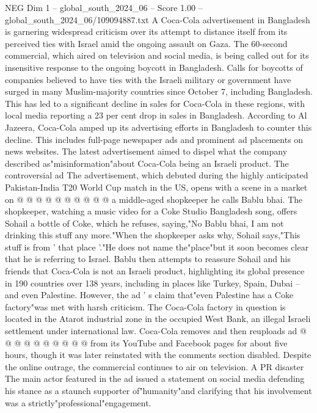 \begin{textsample}{NEG Dim 1 – global\_south\_2024\_06 – Score 1.00 – global\_south\_2024\_06/109094887.txt}  \label{ex:f1_neg_401}
A Coca-Cola advertisement in Bangladesh is garnering widespread criticism over its attempt to distance itself from its perceived ties with Israel amid the ongoing assault on Gaza.
The 60-second commercial, which aired on television and social media, is being called out for its insensitive response to the ongoing boycott in Bangladesh.
Calls for boycotts of companies believed to have ties with the Israeli military or government have surged in many Muslim-majority countries since October 7, including Bangladesh.
This has led to a significant decline in sales for Coca-Cola in these regions, with local media reporting a 23 per cent drop in sales in Bangladesh.
According to Al Jazeera, Coca-Cola amped up its advertising efforts in Bangladesh to counter this decline.
This includes full-page newspaper ads and prominent ad placements on news websites.
The latest advertisement aimed to dispel what the company described as"misinformation"about Coca-Cola being an Israeli product.
The controversial ad The advertisement, which debuted during the highly anticipated Pakistan-India T20 World Cup match in the US, opens with a scene in a market on @ @ @ @ @ @ @ @ @ @ a middle-aged shopkeeper he calls Bablu bhai.
The shopkeeper, watching a music video for a Coke Studio Bangladesh song, offers Sohail a bottle of Coke, which he refuses, saying,"No Bablu bhai, I am not drinking this stuff any more."When the shopkeeper asks why, Sohail says,"This stuff is from ' that place '."He does not name the"place"but it soon becomes clear that he is referring to Israel.
Bablu then attempts to reassure Sohail and his friends that Coca-Cola is not an Israeli product, highlighting its global presence in 190 countries over 138 years, including in places like Turkey, Spain, Dubai -- and even Palestine.
However, the ad ' s claim that"even Palestine has a Coke factory"was met with harsh criticism.
The Coca-Cola factory in question is located in the Atarot industrial zone in the occupied West Bank, an illegal Israeli settlement under international law.
Coca-Cola removes and then reuploads ad @ @ @ @ @ @ @ @ @ @ from its YouTube and Facebook pages for about five hours, though it was later reinstated with the comments section disabled.
Despite the online outrage, the commercial continues to air on television.
A PR disaster The main actor featured in the ad issued a statement on social media defending his stance as a staunch supporter of"humanity"and clarifying that his involvement was a strictly"professional"engagement.

\end{textsample}
